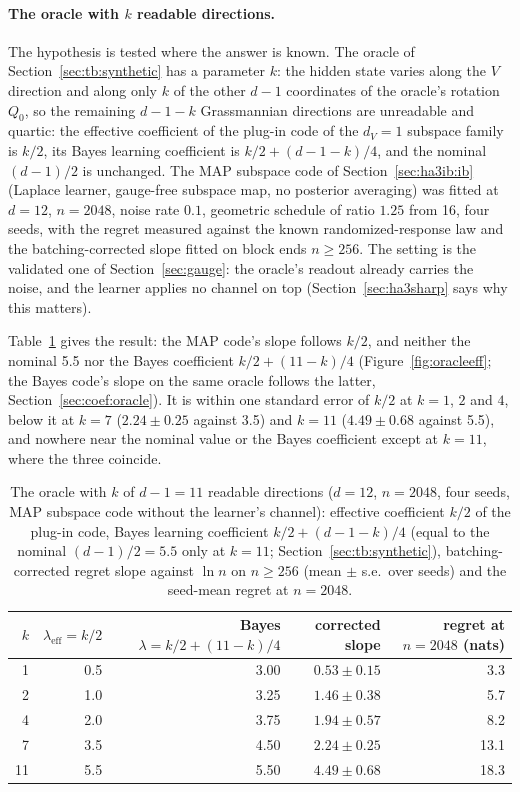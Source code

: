 \documentclass[11pt,a4paper]{article}
\newcommand{\dv}{d_V}
\begin{document}
\paragraph{The oracle with $k$ readable directions.} The hypothesis is tested where the answer is known. The oracle of Section~\ref{sec:tb:synthetic} has a parameter $k$: the hidden state varies along the $V$ direction and along only $k$ of the other $d-1$ coordinates of the oracle's rotation $Q_0$, so the remaining $d-1-k$ Grassmannian directions are unreadable and quartic: the effective coefficient of the plug-in code of the $\dv=1$ subspace family is $k/2$, its Bayes learning coefficient is $k/2+(d-1-k)/4$, and the nominal $(d-1)/2$ is unchanged. The MAP subspace code of Section~\ref{sec:ha3ib:ib} (Laplace learner, gauge-free subspace map, no posterior averaging) was fitted at $d=12$, $n=2048$, noise rate $0.1$, geometric schedule of ratio $1.25$ from 16, four seeds, with the regret measured against the known randomized-response law and the batching-corrected slope fitted on block ends $n\ge256$. The setting is the validated one of Section~\ref{sec:gauge}: the oracle's readout already carries the noise, and the learner applies no channel on top (Section~\ref{sec:ha3sharp} says why this matters).

Table~\ref{tab:ksweep} gives the result: the MAP code's slope follows $k/2$, and neither the nominal 5.5 nor the Bayes coefficient $k/2+(11-k)/4$ (Figure~\ref{fig:oracleeff}; the Bayes code's slope on the same oracle follows the latter, Section~\ref{sec:coef:oracle}). It is within one standard error of $k/2$ at $k=1$, $2$ and $4$, below it at $k=7$ ($2.24\pm0.25$ against 3.5) and $k=11$ ($4.49\pm0.68$ against 5.5), and nowhere near the nominal value or the Bayes coefficient except at $k=11$, where the three coincide.

\begin{table}[t]
\centering
\footnotesize
\caption{The oracle with $k$ of $d-1=11$ readable directions ($d=12$, $n=2048$, four seeds, MAP subspace code without the learner's channel): effective coefficient $k/2$ of the plug-in code, Bayes learning coefficient $k/2+(d-1-k)/4$ (equal to the nominal $(d-1)/2=5.5$ only at $k=11$; Section~\ref{sec:tb:synthetic}), batching-corrected regret slope against $\ln n$ on $n\ge256$ (mean $\pm$ s.e.\ over seeds) and the seed-mean regret at $n=2048$.}
\label{tab:ksweep}
\begin{tabular}{rrrrr}
\toprule
$k$ & $\lambda_{\mathrm{eff}}=k/2$ & Bayes $\lambda=k/2+(11-k)/4$ & corrected slope & regret at $n{=}2048$ (nats) \\
\midrule
1 & 0.5 & 3.00 & $0.53\pm0.15$ & 3.3 \\
2 & 1.0 & 3.25 & $1.46\pm0.38$ & 5.7 \\
4 & 2.0 & 3.75 & $1.94\pm0.57$ & 8.2 \\
7 & 3.5 & 4.50 & $2.24\pm0.25$ & 13.1 \\
11 & 5.5 & 5.50 & $4.49\pm0.68$ & 18.3 \\
\bottomrule
\end{tabular}
\end{table}
\end{document}
